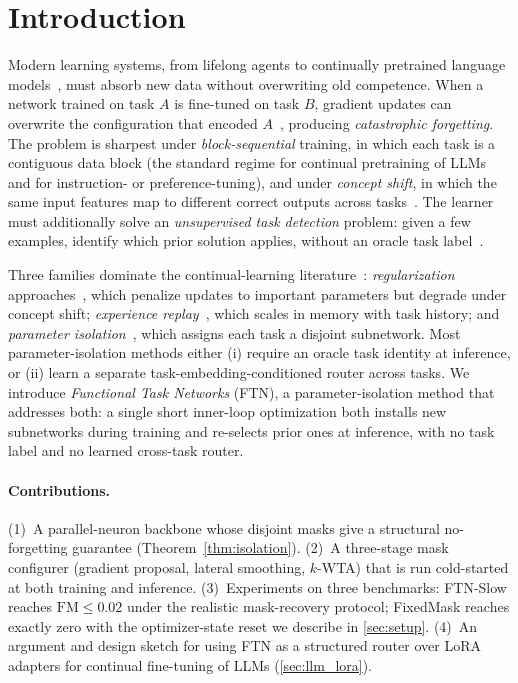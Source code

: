 \documentclass{article}
\theoremstyle{plain}
\theoremstyle{remark}
\begin{document}
\section{Introduction}
\label{sec:intro}
Modern learning systems, from lifelong agents to continually pretrained language models~\citep{gururangan2020dontstop,yildiz2024investigating}, must absorb new data without overwriting old competence. When a network trained on task $A$ is fine-tuned on task $B$, gradient updates can overwrite the configuration that encoded $A$~\citep{mccloskey1989catastrophic,french1999catastrophic}, producing \emph{catastrophic forgetting}. The problem is sharpest under \emph{block-sequential} training, in which each task is a contiguous data block (the standard regime for continual pretraining of LLMs and for instruction- or preference-tuning), and under \emph{concept shift}, in which the same input features map to different correct outputs across tasks~\citep{gama2014concept}. The learner must additionally solve an \emph{unsupervised task detection} problem: given a few examples, identify which prior solution applies, without an oracle task label~\citep{aljundi2019taskfree}.

Three families dominate the continual-learning literature~\citep{parisi2019continual}: \emph{regularization} approaches~\citep{kirkpatrick2017overcoming,zenke2017continual}, which penalize updates to important parameters but degrade under concept shift; \emph{experience replay}~\citep{rebuffi2017icarl,lopez2017gradient}, which scales in memory with task history; and \emph{parameter isolation}~\citep{mallya2018packnet,serra2018overcoming,wortsman2020supermasks,rusu2016progressive,yoon2018lifelong}, which assigns each task a disjoint subnetwork. Most parameter-isolation methods either (i) require an oracle task identity at inference, or (ii) learn a separate task-embedding-conditioned router across tasks. We introduce \emph{Functional Task Networks} (FTN), a parameter-isolation method that addresses both: a single short inner-loop optimization both installs new subnetworks during training and re-selects prior ones at inference, with no task label and no learned cross-task router.

\paragraph{Contributions.}
(1)~A parallel-neuron backbone whose disjoint masks give a structural no-forgetting guarantee (Theorem~\ref{thm:isolation}).
(2)~A three-stage mask configurer (gradient proposal, lateral smoothing, $k$-WTA) that is run cold-started at both training and inference.
(3)~Experiments on three benchmarks: FTN-Slow reaches $\mathrm{FM}\le 0.02$ under the realistic mask-recovery protocol; FixedMask reaches exactly zero with the optimizer-state reset we describe in \cref{sec:setup}.
(4)~An argument and design sketch for using FTN as a structured router over LoRA adapters for continual fine-tuning of LLMs (\cref{sec:llm_lora}).
\end{document}
